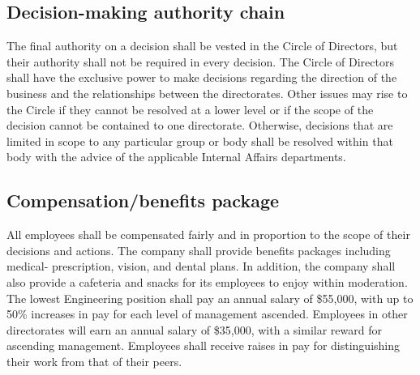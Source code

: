 \subsection{Decision-making authority chain}
The final authority on a decision shall be vested in the Circle of Directors, but their authority shall not be required in every decision. The Circle of Directors shall have the exclusive power to make decisions regarding the direction of the business and the relationships between the directorates. Other issues may rise to the Circle if they cannot be resolved at a lower level or if the scope of the decision cannot be contained to one directorate. Otherwise, decisions that are limited in scope to any particular group or body shall be resolved within that body with the advice of the applicable Internal Affairs departments.



\subsection{Compensation/benefits package}
All employees shall be compensated fairly and in proportion to the scope of their decisions and actions. The company shall provide benefits packages including medical- prescription, vision, and dental plans. In addition, the company shall also provide a cafeteria and snacks for its employees to enjoy within moderation. The lowest Engineering position shall pay an annual salary of \$55,000, with up to 50\% increases in pay for each level of management ascended. Employees in other directorates will earn an annual salary of \$35,000, with a similar reward for ascending management. Employees shall receive raises in pay for distinguishing their work from that of their peers.


